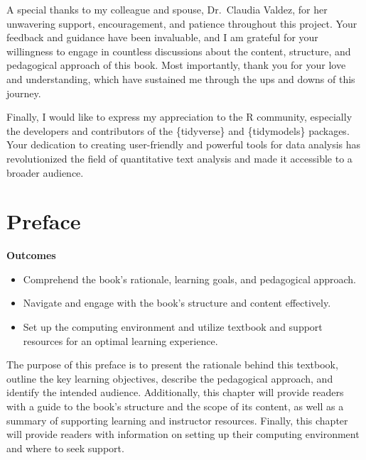 \documentclass[
  letterpaper,
  krantz1]{latex/krantz-mod}
\providecommand{\tightlist}{%
  \setlength{\itemsep}{0pt}\setlength{\parskip}{0pt}}\usepackage{longtable,booktabs,array}
\newcommand{\setDOI}[1]{%
  \gdef\doi{%
    \footnotesize%
    #1\par%
    This chapter has been made available under a CC-BY-NC-ND license.%
  }%
}
\theoremstyle{definition}
\theoremstyle{definition}
\theoremstyle{remark}
\begin{document}
A special thanks to my colleague and spouse, Dr.~Claudia Valdez, for her
unwavering support, encouragement, and patience throughout this project.
Your feedback and guidance have been invaluable, and I am grateful for
your willingness to engage in countless discussions about the content,
structure, and pedagogical approach of this book. Most importantly,
thank you for your love and understanding, which have sustained me
through the ups and downs of this journey.

Finally, I would like to express my appreciation to the R community,
especially the developers and contributors of the \{tidyverse\} and
\{tidymodels\} packages. Your dedication to creating user-friendly and
powerful tools for data analysis has revolutionized the field of
quantitative text analysis and made it accessible to a broader audience.


\chapter*{Preface}\label{sec-preface}


\setDOI{10.4324/9781003393764.0}
\thispagestyle{chapterfirstpage}

\begin{tcolorbox}[enhanced jigsaw, toprule=.15mm, breakable, colback=white, arc=.35mm, left=2mm, colframe=quarto-callout-color-frame, opacityback=0, bottomrule=.15mm, rightrule=.15mm, leftrule=.75mm]

\textbf{ Outcomes}

\begin{itemize}
\tightlist
\item
  Comprehend the book's rationale, learning goals, and pedagogical
  approach.
\item
  Navigate and engage with the book's structure and content effectively.
\item
  Set up the computing environment and utilize textbook and support
  resources for an optimal learning experience.
\end{itemize}

\end{tcolorbox}

The purpose of this preface is to present the rationale behind this
textbook, outline the key learning objectives, describe the pedagogical
approach, and identify the intended audience. Additionally, this chapter
will provide readers with a guide to the book's structure and the scope
of its content, as well as a summary of supporting learning and
instructor resources. Finally, this chapter will provide readers with
information on setting up their computing environment and where to seek
support.
\end{document}
